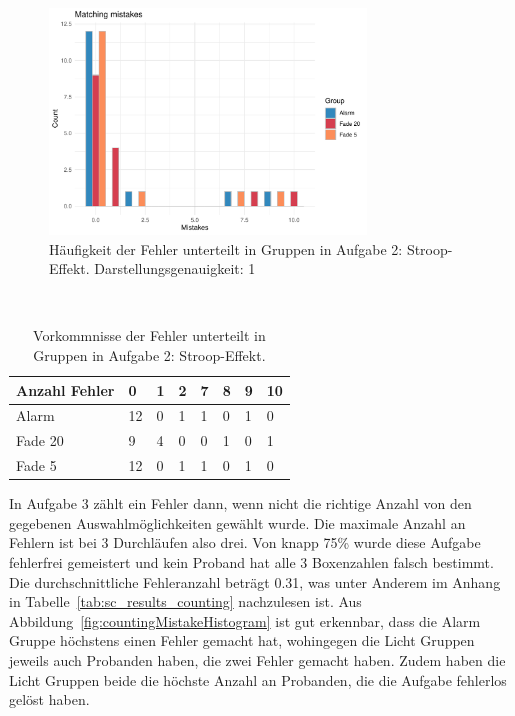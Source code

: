 
\begin{figure}[H]
	\centering
	\includegraphics[width=0.75\textwidth]{./_StudyResults/matchingMisHist}
	\caption{Häufigkeit der Fehler unterteilt in Gruppen in Aufgabe 2: Stroop-Effekt. Darstellungsgenauigkeit: 1}
	\label{fig:matchingMistakeHistogram}
\end{figure}

\begin{table}
	\caption{Vorkommnisse der Fehler unterteilt in Gruppen in Aufgabe 2: Stroop-Effekt.}~\label{tab:matchingMistakeNumbers}
	
	\setlength\tabcolsep{3pt}
	\renewcommand{\arraystretch}{1.4}%
	\begin{tabularx}{\textwidth}{ | l | x | x | x | x | x | x | x | }
		\hline
		Anzahl Fehler & 0   & 1  & 2  & 7  & 8  & 9 & 10 \\ \hline\hline
		Alarm 	  & 12  & 0  & 1  & 1  & 0  & 1 & 0  \\ \hline
		Fade 20   & 9  & 4  & 0  & 0  & 1  & 0 & 1  \\ \hline
		Fade 5 	  & 12  & 0  & 1  & 1  & 0  & 1 & 0  \\ \hline
	\end{tabularx}
\end{table}

In Aufgabe 3 zählt ein Fehler dann, wenn nicht die richtige Anzahl von den gegebenen Auswahlmöglichkeiten gewählt wurde. Die maximale Anzahl an Fehlern ist bei 3 Durchläufen also drei.
Von knapp 75\% wurde diese Aufgabe fehlerfrei gemeistert und kein Proband hat alle 3 Boxenzahlen falsch bestimmt. Die durchschnittliche Fehleranzahl beträgt 0.31, was unter Anderem im Anhang in Tabelle~\ref{tab:sc_results_counting} nachzulesen ist.
Aus Abbildung~\ref{fig:countingMistakeHistogram} ist gut erkennbar, dass die Alarm Gruppe höchstens einen Fehler gemacht hat, wohingegen die Licht Gruppen jeweils auch Probanden haben, die zwei Fehler gemacht haben. Zudem haben die Licht Gruppen beide die höchste Anzahl an Probanden, die die Aufgabe fehlerlos gelöst haben.

